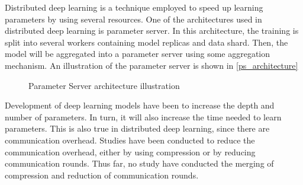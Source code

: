 Distributed deep learning is a technique employed to speed up learning parameters by using several resources. One of the architectures used in distributed deep learning is parameter server\cite{JiangDistributed}. In this architecture, the training is split into several workers containing model replicas and data shard. Then, the model will be aggregated into a parameter server using some aggregation mechanism. An illustration of the parameter server is shown in \autoref{ps_architecture}

\begin{figure}[htbp]
  \centering
  
  \caption{\label{ps_architecture}Parameter Server architecture illustration}
\end{figure}

Development of deep learning models have been to increase the depth and number of parameters. In turn, it will also increase the time needed to learn parameters. This is also true in distributed deep learning, since there are communication overhead. Studies have been conducted to reduce the communication overhead, either by using compression \cite{Chen2022Efficient, Chen2021Quantized} or by reducing communication rounds\cite{Chen2018LAG, Chen2021CADA}. Thus far, no study have conducted the merging of compression and reduction of communication rounds.
